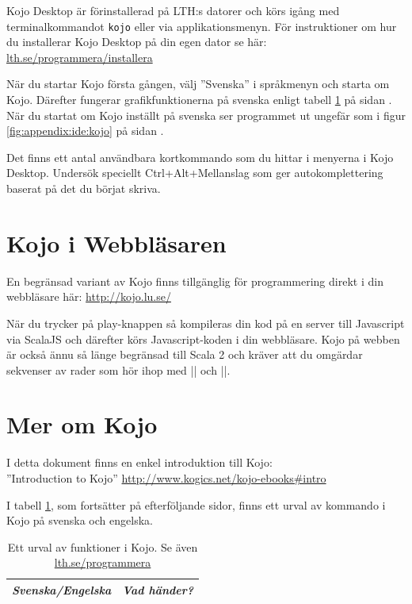 Kojo Desktop är förinstallerad på LTH:s datorer och körs igång med terminalkommandot \texttt{kojo} eller via applikationsmenyn.  För instruktioner om hur du installerar Kojo Desktop på din egen dator se här: \href{http://www.lth.se/programmera/installera/}{lth.se/programmera/installera}

När du startar Kojo första gången, välj ''Svenska'' i språkmenyn och starta om Kojo. Därefter fungerar grafikfunktionerna på svenska enligt tabell \ref{table:kojo:functions} på sidan \pageref{table:kojo:functions}. När du startat om Kojo inställt på svenska ser programmet ut ungefär som i figur \ref{fig:appendix:ide:kojo} på sidan \pageref{fig:appendix:ide:kojo}.

Det finns ett antal användbara kortkommando som du hittar i menyerna i Kojo Desktop. Undersök speciellt Ctrl+Alt+Mellanslag som ger autokomplettering baserat på det du börjat skriva.

\section{Kojo i Webbläsaren}

En begränsad variant av Kojo finns tillgänglig för programmering direkt i din webbläsare här: \url{http://kojo.lu.se/}

När du trycker på play-knappen så kompileras din kod på en server till Javascript via ScalaJS och därefter körs Javascript-koden i din webbläsare. 
Kojo på webben är också ännu så länge begränsad till Scala 2 och kräver att du omgärdar sekvenser av rader som hör ihop med \code|{| och \code|}|.


\section{Mer om Kojo}

I detta dokument finns en enkel introduktion till Kojo: \\ ''Introduction to Kojo'' \url{http://www.kogics.net/kojo-ebooks#intro}

\noindent I tabell \ref{table:kojo:functions}, som fortsätter på efterföljande sidor, finns ett urval av kommando i Kojo på svenska och engelska.

{\small\renewcommand{\arraystretch}{1.4}
\begin{longtable}{@{}p{} p{}}

\caption{Ett urval av funktioner i Kojo. Se även \href{http://lth.se/programmera}{lth.se/programmera}}\label{table:kojo:functions}\\

\emph{Svenska/Engelska} & \emph{Vad händer?}  \\ \hline

\end{longtable}
}%

